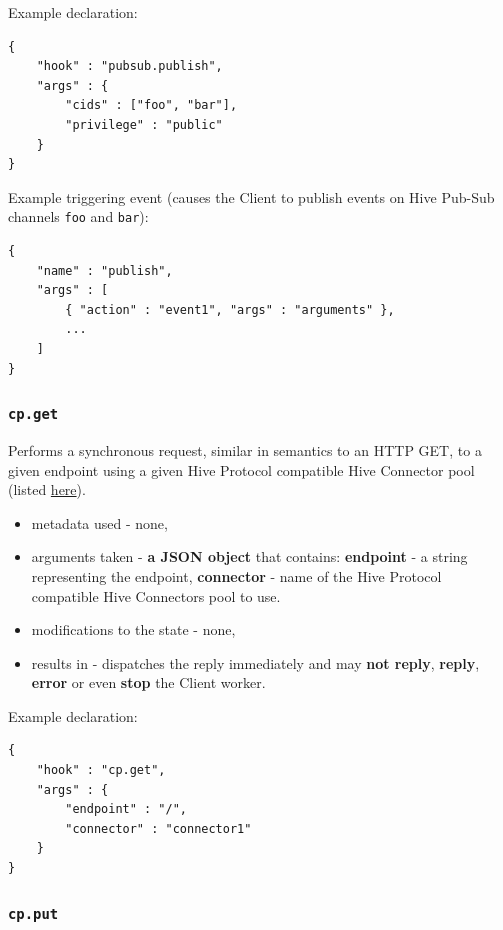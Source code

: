 \documentclass[a4paper]{article}
\begin{document}
\noindent
Example declaration:

\begin{verbatim}
{
    "hook" : "pubsub.publish",
    "args" : {
        "cids" : ["foo", "bar"],
        "privilege" : "public"
    }
}
\end{verbatim}




\noindent
Example triggering event (causes the Client to publish events on Hive Pub-Sub channels \texttt{foo} and \texttt{bar}):


\begin{verbatim}
{
    "name" : "publish",
    "args" : [
        { "action" : "event1", "args" : "arguments" },
        ...
    ]
}
\end{verbatim}
\subsubsection{\texttt{cp.get}}
\label{sec-8-2-7}
\label{ref-hive_protocol_hook}

Performs a synchronous request, similar in semantics to an HTTP GET, to a given endpoint using a given Hive Protocol compatible Hive Connector pool (listed \hyperref[ref-cp_connector]{here}).


\begin{itemize}
\item metadata used - none,
\item arguments taken - \textbf{a JSON object} that contains: \textbf{endpoint} - a string representing the endpoint, \textbf{connector} - name of the Hive Protocol compatible Hive Connectors pool to use.
\item modifications to the state - none,
\item results in - dispatches the reply immediately and may \textbf{not reply}, \textbf{reply}, \textbf{error} or even \textbf{stop} the Client worker.
\end{itemize}

\noindent
Example declaration:

\begin{verbatim}
{
    "hook" : "cp.get",
    "args" : {
        "endpoint" : "/",
        "connector" : "connector1"
    }
}
\end{verbatim}
\subsubsection{\texttt{cp.put}}
\label{sec-8-2-8}
\end{document}
